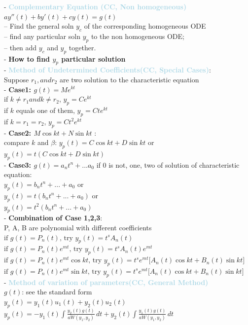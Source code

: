 \documentclass[twocolumn]{article}
\newcommand{\method}[1]{\textbf{\textcolor{lightblue}{#1}}}
\newcommand{\properties}[1]{\textbf{\textcolor{rosered}{#1}}}
\begin{document}
- \method{Complementary Equation (\properties{CC, Non homogeneous})}\\
$ay''(t)+ by'(t)+ cy(t) = g(t)$\\
– Find the general soln $y_c$ of the corresponding homogeneous ODE\\
– find any particular soln $y_p$ to the non homogeneous ODE;\\
– then add $y_c$ and $y_p$ together.\\

- \textbf{How to find $y_p$ particular solution}\\
- \method{Method of Undetermined  Coefficients(\properties{CC, Special Cases})}:\\
Suppose $r_1, and r_2$  are two solution to the characteristic equation\\
- \textbf{Case1: $g(t) = Me^{kt}$}\\
if $k \neq r_1 and k \neq r_2 $, $y_p = Ce^{kt}$\\
if $k$ equals one of them, $y_p = Cte^{kt}$\\
if $k = r_1 = r_2$, $y_p = Ct^2e^{kt}$\\
- \textbf{Case2: $M \cos{kt}+N\sin{kt}$ }: \\
compare $k$ and $\beta$: $y_p(t) = C \cos{kt} + D \sin{kt}$ or \\
$y_p(t) = t(C \cos{kt} + D \sin{kt})$\\
- \textbf{Case3: $g(t) = a_n t^n + ... a_0$}
if 0 is not, one, two of solution of characteristic equation:\\
$y_p(t) = b_n t^n  + ... + a_0$ or\\
$y_p(t) = t(b_n t^n  + ... + a_0)$ or\\
$y_p(t) = t^2(b_n t^n  + ... + a_0)$\\
- \textbf{Combination of Case 1,2,3}:\\
P, A, B are polynomial with different coefficients\\
$\text{if } g(t) = P_n(t) \text{, try } y_p(t) = t^s A_n(t)$\\
$\text{if } g(t) = P_n(t)e^{mt} \text{, try } y_p(t) = t^s A_n(t)e^{mt}$\\
$\text{if } g(t) = P_n(t)e^{mt} \cos kt \text{, try } y_p(t) = t^s e^{mt} \big[A_n(t) \cos kt + B_n(t) \sin kt\big]$\\
$\text{if } g(t) = P_n(t)e^{mt} \sin kt \text{, try } y_p(t) = t^s e^{mt} \big[A_n(t) \cos kt + B_n(t) \sin kt\big]$\\
- \method{Method of variation of parameters(\properties{CC, General Method})}\\
$g(t)$: see the standard form\\
$y_p(t) = y_1(t)u_1(t) + y_2(t)u_2(t)$\\
$y_p(t) = -y_1(t) \int \frac{y_2(t) g(t)}{a W(y_1, y_2)} \, dt + y_2(t) \int \frac{y_1(t) g(t)}{a W(y_1, y_2)} \, dt$\\
\end{document}
